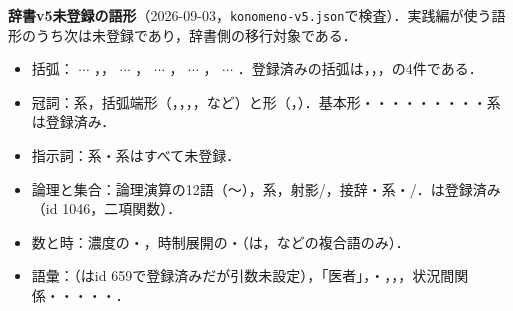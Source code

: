 \documentclass[../../main-detail.tex]{subfiles}
\begin{document}
\begin{devbox}
\textbf{辞書v5未登録の語形}（2026-09-03，\texttt{konomeno-v5.json}で検査）．実践編が使う語形のうち次は未登録であり，辞書側の移行対象である．
\begin{itemize}
    \item 括弧： $\cdots$ ，， $\cdots$ ， $\cdots$ ， $\cdots$ ， $\cdots$ ．登録済みの括弧は，，，の4件である．
    \item 冠詞：系，括弧端形（，，，，など）と形（，）．基本形・・・・・・・・・系は登録済み．
    \item 指示詞：系・系はすべて未登録．
    \item 論理と集合：論理演算の12語（〜），系，射影/，接辞・系・/．は登録済み（id 1046，二項関数）．
    \item 数と時：濃度の・，時制展開の・（は，などの複合語のみ）．
    \item 語彙：（はid 659で登録済みだが引数未設定），「医者」，・，，，状況間関係・・・・・．
\end{itemize}
\end{devbox}
\end{document}
